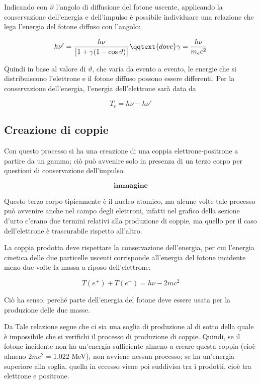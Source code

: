 Indicando con $\vartheta$ l'angolo di diffusione del fotone uscente, applicando la conservazione dell'energia e dell'impulso è possibile individuare una relazione che lega l'energia del fotone diffuso con l'angolo:

\begin{equation*}
    h\nu'=\frac{h\nu}{\big[1 + \gamma (1 - \cos{\vartheta})\big]}
    \qqtext{dove}
    \gamma=\frac{h\nu}{m_ec^2}
\end{equation*}

Quindi in base al valore di $\vartheta$, che varia da evento a evento, le energie che si distribuiscono l'elettrone e il fotone diffuso possono essere differenti.
Per la conservazione dell'energia, l'energia dell'elettrone sarà data da

\begin{equation*}
    T_e=h\nu - h\nu'
\end{equation*}



\subsection{Creazione di coppie}

Con questo processo si ha una creazione di una coppia elettrone-positrone a partire da un gamma; ciò può avvenire solo in presenza di un terzo corpo per questioni di conservazione dell'impulso.

$$\textbf{immagine}$$

Questo terzo corpo tipicamente è il nucleo atomico, ma alcune volte tale processo può avvenire anche nel campo degli elettroni, infatti nel grafico della sezione d'urto c'erano due termini relativi alla produzione di coppie, ma quello per il caso dell'elettrone è trascurabile rispetto all'altro.

La coppia prodotta deve rispettare la conservazione dell'energia, per cui l'energia cinetica delle due particelle uscenti corrisponde all'energia del fotone incidente meno due volte la massa a riposo dell'elettrone:

\begin{equation*}
    T(e^+) + T(e^-)=h\nu - 2mc^2
\end{equation*}

Ciò ha senso, perché parte dell'energia del fotone deve essere usata per la produzione delle due masse.

Da Tale relazione segue che ci sia una soglia di produzione al di sotto della quale è impossibile che si verifichi il processo di produzione di coppie. Quindi, se il fotone incidente non ha un'energia sufficiente almeno a creare questa coppia (cioè almeno $2mc^2=1.022$ MeV), non avviene nessun processo; se ha un'energia superiore alla soglia, quella in eccesso viene poi suddivisa tra i prodotti, cioè tra elettrone e positrone.


